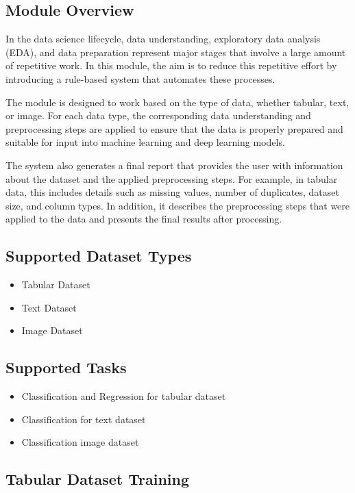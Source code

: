 \subsection{Module Overview}

In the data science lifecycle, data understanding, exploratory data analysis (EDA), and data preparation represent major stages that involve a large amount of repetitive work. In this module, the aim is to reduce this repetitive effort by introducing a rule-based system that automates these processes.

The module is designed to work based on the type of data, whether tabular, text, or image. For each data type, the corresponding data understanding and preprocessing steps are applied to ensure that the data is properly prepared and suitable for input into machine learning and deep learning models.

The system also generates a final report that provides the user with information about the dataset and the applied preprocessing steps. For example, in tabular data, this includes details such as missing values, number of duplicates, dataset size, and column types. In addition, it describes the preprocessing steps that were applied to the data and presents the final results after processing.
\subsection{Supported Dataset Types}
\begin{itemize}
  \item Tabular Dataset
  \item Text Dataset
  \item Image Dataset
\end{itemize}
\subsection{Supported Tasks }

\begin{itemize}
  \item Classification and Regression for tabular dataset
  \item Classification for text dataset
  \item Classification image dataset
\end{itemize}


\subsection{Tabular Dataset Training}

